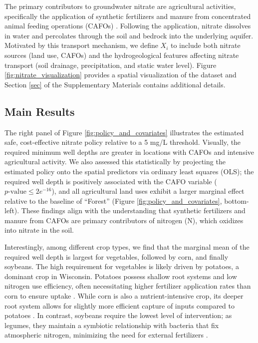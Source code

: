 \documentclass[12pt]{article}
\newcommand{\CP}[1]{{\color{purple}From Chan: #1}}
\newcommand{\XL}[1]{{\color{blue}from Xindi: #1}}
\begin{document}
The primary contributors to groundwater nitrate are agricultural activities, specifically the application of synthetic fertilizers and manure from concentrated animal feeding operations (CAFOs) \citep{Nolan2002, Hudak2000, Spalding1993, Sobota2013, Sabo2018}. Following the application, nitrate dissolves in water and percolates through the soil and bedrock into the underlying aquifer. Motivated by this transport mechanism, we define $X_i$ to include both nitrate sources (land use, CAFOs) and the hydrogeological features affecting nitrate transport (soil drainage, precipitation, and static water level). Figure \ref{fig:nitrate_visualization} provides a spatial visualization of the dataset and Section \ref{sec} of the Supplementary Materials contains additional details.



\subsection{Main Results}

\noindent The right panel of Figure \ref{fig:policy_and_covariates} illustrates the estimated safe, cost-effective nitrate policy relative to a 5 mg/L threshold. Visually, the required minimum well depths are greater in locations with CAFOs and intensive agricultural activity. We also assessed  this statistically by projecting the estimated policy onto the spatial predictors via ordinary least squares (OLS); the required well depth is positively associated with the CAFO variable ($p\text{-value} \le 2e^{-16}$), and all agricultural land uses exhibit a larger marginal effect relative to the baseline of ``Forest'' (Figure \ref{fig:policy_and_covariates}, bottom-left). These findings align with the understanding that synthetic fertilizers and manure from CAFOs are primary contributors of nitrogen (N), which oxidizes into nitrate in the soil. 

Interestingly, among different crop types, we find that the marginal mean of the required well depth is largest for vegetables, followed by corn, and finally soybeans. The high requirement for vegetables is likely driven by potatoes, a dominant crop in Wisconsin. Potatoes possess shallow root systems and low nitrogen use efficiency, often necessitating higher fertilizer application rates than corn to ensure uptake \citep{laboski2012nutrient}. While corn is also a nutrient-intensive crop, its deeper root system allows for slightly more efficient capture of inputs compared to potatoes \citep{stalham2007effects}. In contrast, soybeans require the lowest level of intervention; as legumes, they maintain a symbiotic relationship with bacteria that fix atmospheric nitrogen, minimizing the need for external fertilizers \citep{salvagiotti2008nitrogen}. 
\end{document}
